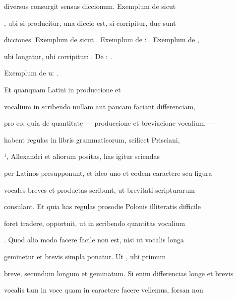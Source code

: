  diversus consurgit sensus diccionum. Exemplum de  sicut 

, ubi si  producitur, una diccio est, si corripitur, due sunt

dicciones. Exemplum de  sicut  . Exemplum de :  . Exemplum de , 

ubi longatur, ubi corripitur:  . De :  .

\splitlines{}

Exemplum de u:  .

\indentK Et quanquam Latini in produccione et 

\fulllines{}

 vocalium in scribendo nullam aut paucam faciant differenciam,

pro eo, quia de quantitate — produccione et breviacione vocalium — 

 habent regulas in libris grammaticorum, scilicet Prisciani,


¹, Allexandri et aliorum positas, has igitur sciendas

per Latinos presupponunt, et ideo uno et eodem caractere seu figura

vocales breves et productas scribunt, ut brevitati scripturarum

consulant. Et quia has regulas prosodie Polonis illiteratis difficile

foret tradere, opportuit, ut in scribendo quantitas vocalium 

. Quod alio modo facere facile non est, nisi ut vocalis longa

geminetur et brevis simpla ponatur. Ut , ubi primum 

breve, secundum longum et geminatum. Si enim differencias longe et brevis

vocalis tam in voce quam in caractere facere vellemus, forsan non

